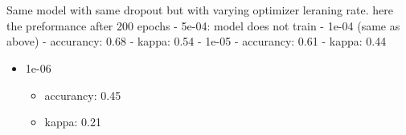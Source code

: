 \documentclass[11pt]{article}
\providecommand{\tightlist}{%
      \setlength{\itemsep}{0pt}\setlength{\parskip}{0pt}}
\begin{document}
    \begin{center}
    \end{center}
    { \hspace*{\fill} \\}
    
    \begin{center}
    \end{center}
    { \hspace*{\fill} \\}
    
    Same model with same dropout but with varying optimizer leraning rate.
here the preformance after 200 epochs - 5e-04: model does not train -
1e-04 (same as above) - accurancy: 0.68 - kappa: 0.54 - 1e-05 -
accurancy: 0.61 - kappa: 0.44

\begin{itemize}
\tightlist
\item
  1e-06

  \begin{itemize}
  \tightlist
  \item
    accurancy: 0.45
  \item
    kappa: 0.21
  \end{itemize}
\end{itemize}
\end{document}
